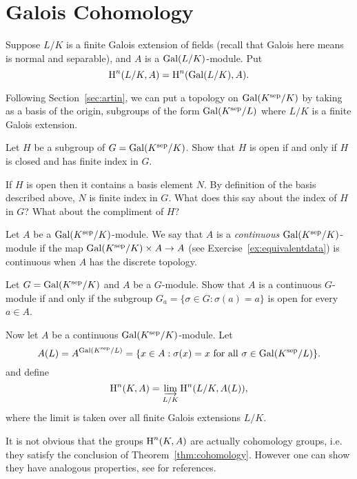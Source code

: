 \section{Galois Cohomology}

Suppose $L/K$ is a finite Galois extension of fields
(recall that Galois here means is normal and separable),
and $A$ is a $\operatorname{Gal}(L/K)$-module.
Put
$$
	\operatorname{H}^n(L/K, A) = \operatorname{H}^n(\operatorname{Gal}(L/K), A).
$$

Following Section~\ref{sec:artin}, we can put a topology
on $\operatorname{Gal}(K^{\operatorname{sep}}/K)$ by taking as a basis of the origin,
subgroups of the form $\operatorname{Gal}(K^{\operatorname{sep}}/L)$ where $L/K$
is a finite Galois extension.

\begin{exercise}
	Let $H$ be a subgroup of $G = \operatorname{Gal}(K^{\operatorname{sep}}/K)$.
	Show that $H$ is open if and only if $H$ is closed
	and has finite index in $G$.
	\begin{hint}
		If $H$ is open then it contains a basis element $N$.
		By definition of the basis described above, $N$ is
		finite index in $G$. What does this say about
		the index of $H$ in $G$? What about the compliment
		of $H$?
	\end{hint}
\end{exercise}

\begin{definition}
	Let $A$ be a $\operatorname{Gal}(K^{\operatorname{sep}}/K)$-module. We say that $A$
	is a \emph{continuous} $\operatorname{Gal}(K^{\operatorname{sep}}/K)$-module if the map
	$\operatorname{Gal}(K^{\operatorname{sep}}/K)\times A \to A$
	(see Exercise~\ref{ex:equivalentdata}) is continuous when $A$
	has the discrete topology.
\end{definition}

\begin{exercise}
	Let $G = \operatorname{Gal}(K^{\operatorname{sep}}/K)$ and $A$ be a $G$-module.
	Show that $A$ is a continuous $G$-module
	if and only if the subgroup
	$G_a = \{\sigma \in G : \sigma(a) = a\}$ is open
	for every $a\in A$.
\end{exercise}

Now let $A$ be a continuous $\operatorname{Gal}(K^{\operatorname{sep}}/K)$-module. Let
$$
	A(L) = A^{\operatorname{Gal}(K^{\operatorname{sep}}/L)} = \{x \in A : \sigma(x) = x
	\text{ for all } \sigma \in\operatorname{Gal}(K^{\operatorname{sep}}/L)\}.
$$
and define
$$
	\operatorname{H}^n(K,A) = \varinjlim_{L/K} \operatorname{H}^n(L/K,A(L)),
$$
where the limit is taken over all finite Galois
extensions $L/K$.

It is not obvious that the groups $\operatorname{H}^n(K,A)$ are
actually cohomology groups, i.e. they satisfy the
conclusion of Theorem~\ref{thm:cohomology}. However
one can show they have analogous properties, see
\cite[Ch.~X.3]{serre:localfields} for references.

